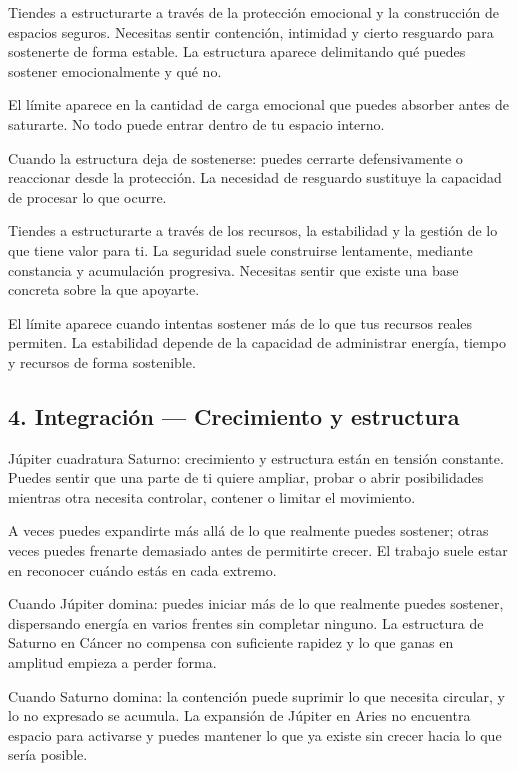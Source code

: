 \documentclass[11pt,a4paper]{article}
\begin{document}
Tiendes a estructurarte a través de la protección emocional y la construcción de espacios seguros. Necesitas sentir contención, intimidad y cierto resguardo para sostenerte de forma estable. La estructura aparece delimitando qué puedes sostener emocionalmente y qué no.

El límite aparece en la cantidad de carga emocional que puedes absorber antes de saturarte. No todo puede entrar dentro de tu espacio interno.

Cuando la estructura deja de sostenerse: puedes cerrarte defensivamente o reaccionar desde la protección. La necesidad de resguardo sustituye la capacidad de procesar lo que ocurre.

Tiendes a estructurarte a través de los recursos, la estabilidad y la gestión de lo que tiene valor para ti. La seguridad suele construirse lentamente, mediante constancia y acumulación progresiva. Necesitas sentir que existe una base concreta sobre la que apoyarte.

El límite aparece cuando intentas sostener más de lo que tus recursos reales permiten. La estabilidad depende de la capacidad de administrar energía, tiempo y recursos de forma sostenible.

\vspace{0.8cm}


\subsection{4. Integración — Crecimiento y estructura}

Júpiter cuadratura Saturno: crecimiento y estructura están en tensión constante. Puedes sentir que una parte de ti quiere ampliar, probar o abrir posibilidades mientras otra necesita controlar, contener o limitar el movimiento.

A veces puedes expandirte más allá de lo que realmente puedes sostener; otras veces puedes frenarte demasiado antes de permitirte crecer. El trabajo suele estar en reconocer cuándo estás en cada extremo.

Cuando Júpiter domina: puedes iniciar más de lo que realmente puedes sostener, dispersando energía en varios frentes sin completar ninguno. La estructura de Saturno en Cáncer no compensa con suficiente rapidez y lo que ganas en amplitud empieza a perder forma.

Cuando Saturno domina: la contención puede suprimir lo que necesita circular, y lo no expresado se acumula. La expansión de Júpiter en Aries no encuentra espacio para activarse y puedes mantener lo que ya existe sin crecer hacia lo que sería posible.
\end{document}

